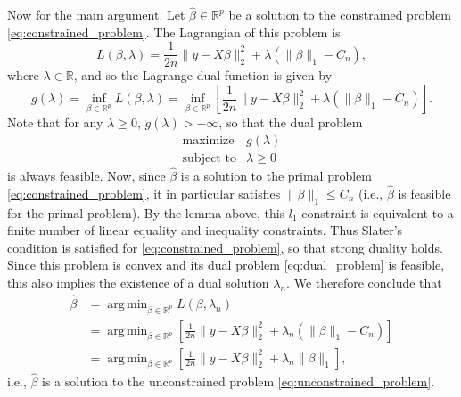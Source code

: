 \documentclass[letterpaper,12pt]{article}
\DeclareMathOperator*{\argmin}{arg\,min}
\newcommand{\norm}[1]{\lVert#1\rVert}
\begin{document}
Now for the main argument. Let $\hat{\beta} \in \mathbb{R}^p$ be a
solution to the constrained problem
\eqref{eq:constrained_problem}. The Lagrangian of this problem is
\begin{equation*}
  L(\beta, \lambda) = \frac{1}{2n} \norm{y - X\beta}_2^2
    + \lambda(\norm{\beta}_1 - C_n),
\end{equation*}
where $\lambda \in \mathbb{R}$, and so the Lagrange dual function is
given by
\begin{equation*}
  g(\lambda) = \inf_{\beta \in \mathbb{R}^p} L(\beta, \lambda)
    = \inf_{\beta \in \mathbb{R}^p} \left [ \frac{1}{2n} \norm{y - X\beta}_2^2
      + \lambda(\norm{\beta}_1 - C_n) \right ].
\end{equation*}
Note that for any $\lambda \geq 0$, $g(\lambda) > -\infty$, so that
the dual problem
\begin{equation} \label{eq:dual_problem}
  \begin{array}{ll}
    \text{maximize} & g(\lambda) \\
    \text{subject to}
      & \lambda \geq 0
  \end{array}
\end{equation}
is always feasible. Now, since $\hat{\beta}$ is a solution to the
primal problem \eqref{eq:constrained_problem}, it in particular
satisfies $\norm{\beta}_1 \leq C_n$ (i.e., $\hat{\beta}$ is feasible
for the primal problem). By the lemma above, this $l_1$-constraint is
equivalent to a finite number of linear equality and inequality
constraints. Thus Slater's condition is satisfied for
\eqref{eq:constrained_problem}, so that strong duality holds. Since
this problem is convex and its dual problem \eqref{eq:dual_problem} is
feasible, this also implies the existence of a dual solution
$\lambda_n$. We therefore conclude that
\begin{align*}
  \hat{\beta} &= \argmin_{\beta \in \mathbb{R}^p} L(\beta, \lambda_n) \\
    &= \argmin_{\beta \in \mathbb{R}^p} \left [ \frac{1}{2n}
      \norm{y - X\beta}_2^2 + \lambda_n (\norm{\beta}_1 - C_n) \right ] \\
    &= \argmin_{\beta \in \mathbb{R}^p} \left [ \frac{1}{2n}
      \norm{y - X\beta}_2^2 + \lambda_n \norm{\beta}_1 \right ],
\end{align*}
i.e., $\hat{\beta}$ is a solution to the unconstrained problem
\eqref{eq:unconstrained_problem}.
\end{document}
